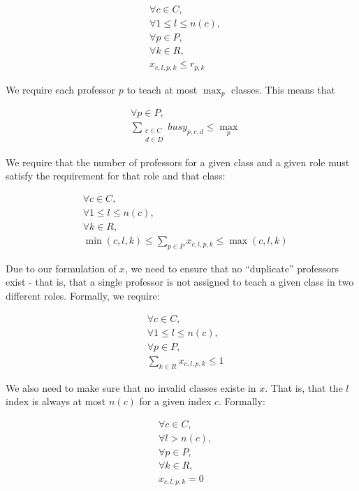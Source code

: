 \begin{align} \label{eq:rolevalidity}
  &\forall c \in C,\\
  &\forall 1 \le l \le n(c),\\
  &\forall p \in P,\\
  &\forall k \in R,\\
  &x_{c, l, p, k} \le r_{p, k}
\end{align}

We require each professor $p$ to teach at most $\max_p$ classes. This means that

\begin{align}
  &\forall p \in P,\\
  &\sum_{\substack{c \in C\\d \in D}} busy_{p, c, d} \le \textstyle{\max_p}
\end{align}

We require that the number of professors for a given class and a given role must satisfy the requirement for that role and that class:

\begin{align}
  &\forall c \in C,\\
  &\forall 1 \le l \le n(c),\\
  &\forall k \in R,\\
  &\min(c, l, k) \le \sum_{p \in P} x_{c, l, p, k} \le \max(c, l, k)
\end{align}

Due to our formulation of $x$, we need to ensure that no ``duplicate'' professors exist - that is, that a single professor is not assigned to teach a given class in two different roles. Formally, we require:

\begin{align}
  &\forall c \in C,\\
  &\forall 1 \le l \le n(c),\\
  &\forall p \in P,\\
  &\sum_{k \in R} x_{c, l, p, k} \le 1
\end{align}

We also need to make sure that no invalid classes existe in $x$. That is, that the $l$ index is always at most $n(c)$ for a given index $c$. Formally:

\begin{align} \label{eq:noinvalidclasses}
 &\forall c\in C,\\
 &\forall l > n(c),\\
 &\forall p \in P,\\
 &\forall k \in R,\\
 &x_{c, l, p, k} = 0
\end{align}

